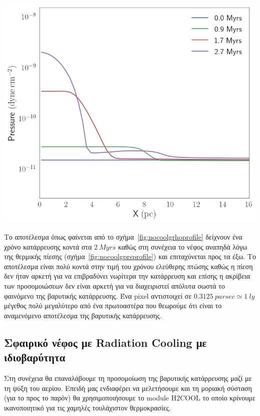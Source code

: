 \begin{marginfigure}
	\centering
	\includegraphics[width=1\linewidth]{DataImages/NoCoolGPRSprofile.png}
	\caption{}
	\label{fig:nocoolgprsprofile}
\end{marginfigure}

Το αποτέλεσμα όπως φαίνεται από το σχήμα~\ref{fig:nocoolgrhoprofile} δείχνουν ένα χρόνο κατάρρευσης κοντά στα $\SI{2}{Myrs}$ καθώς στη συνέχεια το νέφος αναπηδά λόγω της θερμικής πίεσης (σχήμα~\ref{fig:nocoolgprsprofile}) και επιταχύνεται προς τα έξω.
Το αποτέλεσμα είναι πολύ κοντά στην τιμή του χρόνου ελεύθερης πτώσης καθώς η πίεση δεν ήταν αρκετή για να επιβραδύνει νωρίτερα την κατάρρευση και επίσης η ακρίβεια των προσομοιώσεων δεν είναι αρκετή για να διαχειριστεί απόλυτα σωστά το φαινόμενο της βαρυτικής κατάρρευσης. Ένα pixel αντιστοιχεί σε $\SI{0.3125}{parsec}\simeq \SI{1}{ly}$ μέγεθος πολύ μεγαλύτερο από ένα πρωτοαστέρα που θεωρούμε ότι είναι το αναμενόμενο αποτέλεσμα της βαρυτικής κατάρρευσης.

\subsection{Σφαιρικό νέφος με Radiation Cooling με ιδιοβαρύτητα}

Στη συνέχεια θα επαναλάβουμε τη προσομοίωση της βαρυτικής κατάρρευσης μαζί με τη ψύξη του αερίου. Επειδή μας ενδιαφέρει να μελετήσουμε και τη μοριακή σύσταση (για το  προς το παρόν) θα χρησιμοποιήσουμε το module H2COOL το οποίο κρίνουμε ικανοποιητικό για τις χαμηλές τουλάχιστον θερμοκρασίες.
 
